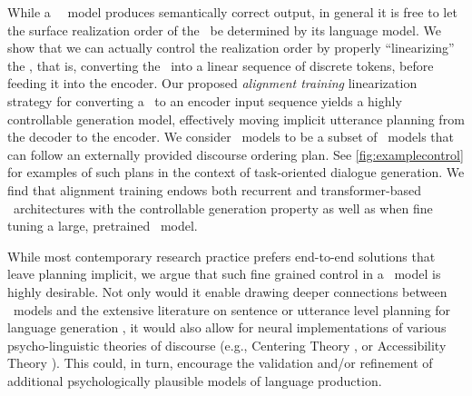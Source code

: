 












 While a
\faithful~\sequencetosequence~model produces semantically correct output, in general
it is free to let the surface realization order of the \attributevalues~be 
determined by its language model. We show that we can actually control the realization
order by properly ``linearizing'' the \meaningrepresentation, that is, converting the \meaningrepresentation~into a linear sequence of discrete tokens, before
feeding it into the encoder. Our proposed \textit{alignment training}
linearization strategy for converting a \meaningrepresentation~to an 
encoder input sequence yields a highly controllable generation model, effectively moving implicit utterance planning from the decoder to the encoder.
We consider
\controllablegeneration~models to be a subset of \faithfulgeneration~models 
that can follow an externally provided discourse ordering plan.
See \autoref{fig:examplecontrol} for examples of such plans in the
context of  task-oriented dialogue generation.
 We find that alignment training endows both recurrent and transformer-based
\sequencetosequence~architectures with the controllable generation property as well 
as when fine tuning a large, pretrained \sequencetosequence~model.






While most contemporary research practice prefers end-to-end solutions that
leave planning implicit, we argue that such fine grained control in a
\sequencetosequence~model  is highly desirable. 
Not only would it enable drawing deeper connections
between \sequencetosequence~models and 
the extensive literature on sentence or utterance level planning for language
generation \citep{reiter2000,walker2001,stone2003}, it would also allow 
for neural implementations of various psycho-linguistic
theories of discourse (e.g., Centering Theory \citep{grosz1995}, or
Accessibility Theory \citep{ariel2001}).  This could, in turn, encourage the
validation and/or refinement of additional psychologically plausible models of
language production. 

